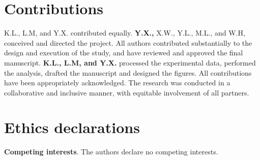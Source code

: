 \documentclass[unnumsec,webpdf,contemporary,large]{oup-authoring-template}%
\theoremstyle{thmstyleone}%
\theoremstyle{thmstyletwo}%
\theoremstyle{thmstylethree}%
\begin{document}
\section*{Contributions}

K.L., L.M, and Y.X. contributed equally. \textbf{Y.X.,} X.W., Y.L., M.L., and W.H, conceived and directed the project. All authors contributed substantially to the design and execution of the study, and have reviewed and approved the final manuscript. \textbf{K.L., L.M, and Y.X.} processed the experimental data, performed the analysis, drafted the manuscript and designed the figures.  All contributions have been appropriately acknowledged. The research was conducted in a collaborative and inclusive manner, with equitable involvement of all partners.

\section*{Ethics declarations}

\textbf{Competing interests}. The authors declare no competing interests.














\end{document}
